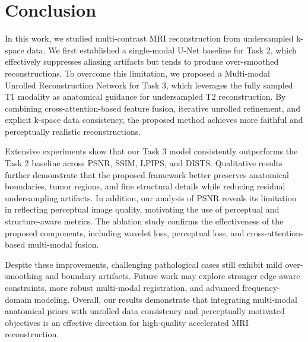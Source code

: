 \section{Conclusion}

In this work, we studied multi-contrast MRI reconstruction from undersampled k-space data. We first established a single-modal U-Net baseline for Task 2, which effectively suppresses aliasing artifacts but tends to produce over-smoothed reconstructions. To overcome this limitation, we proposed a Multi-modal Unrolled Reconstruction Network for Task 3, which leverages the fully sampled T1 modality as anatomical guidance for undersampled T2 reconstruction. By combining cross-attention-based feature fusion, iterative unrolled refinement, and explicit k-space data consistency, the proposed method achieves more faithful and perceptually realistic reconstructions.

Extensive experiments show that our Task 3 model consistently outperforms the Task 2 baseline across PSNR, SSIM, LPIPS, and DISTS. Qualitative results further demonstrate that the proposed framework better preserves anatomical boundaries, tumor regions, and fine structural details while reducing residual undersampling artifacts. In addition, our analysis of PSNR reveals its limitation in reflecting perceptual image quality, motivating the use of perceptual and structure-aware metrics. The ablation study confirms the effectiveness of the proposed components, including wavelet loss, perceptual loss, and cross-attention-based multi-modal fusion.

Despite these improvements, challenging pathological cases still exhibit mild over-smoothing and boundary artifacts. Future work may explore stronger edge-aware constraints, more robust multi-modal registration, and advanced frequency-domain modeling. Overall, our results demonstrate that integrating multi-modal anatomical priors with unrolled data consistency and perceptually motivated objectives is an effective direction for high-quality accelerated MRI reconstruction.